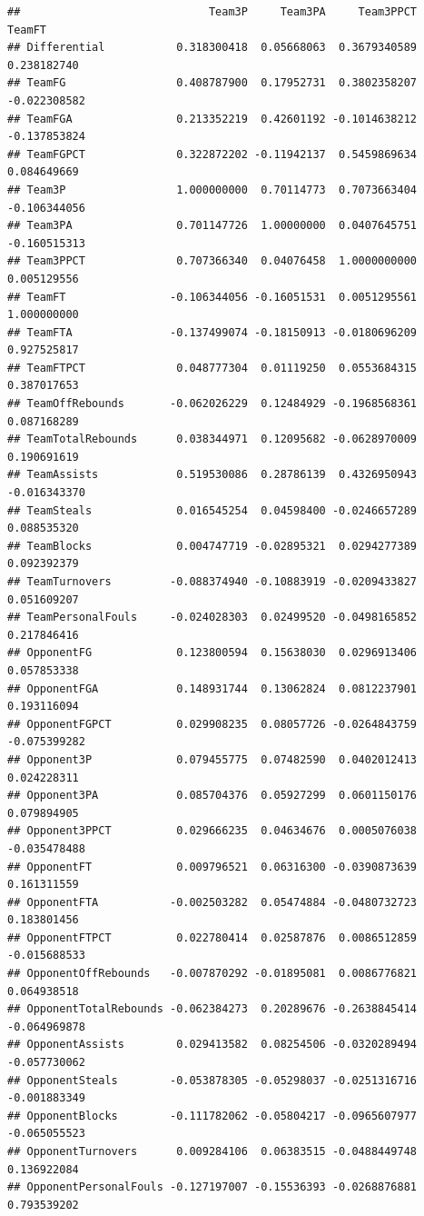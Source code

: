 \documentclass[
]{book}
\begin{document}
\begin{verbatim}
##                             Team3P     Team3PA     Team3PPCT       TeamFT
## Differential           0.318300418  0.05668063  0.3679340589  0.238182740
## TeamFG                 0.408787900  0.17952731  0.3802358207 -0.022308582
## TeamFGA                0.213352219  0.42601192 -0.1014638212 -0.137853824
## TeamFGPCT              0.322872202 -0.11942137  0.5459869634  0.084649669
## Team3P                 1.000000000  0.70114773  0.7073663404 -0.106344056
## Team3PA                0.701147726  1.00000000  0.0407645751 -0.160515313
## Team3PPCT              0.707366340  0.04076458  1.0000000000  0.005129556
## TeamFT                -0.106344056 -0.16051531  0.0051295561  1.000000000
## TeamFTA               -0.137499074 -0.18150913 -0.0180696209  0.927525817
## TeamFTPCT              0.048777304  0.01119250  0.0553684315  0.387017653
## TeamOffRebounds       -0.062026229  0.12484929 -0.1968568361  0.087168289
## TeamTotalRebounds      0.038344971  0.12095682 -0.0628970009  0.190691619
## TeamAssists            0.519530086  0.28786139  0.4326950943 -0.016343370
## TeamSteals             0.016545254  0.04598400 -0.0246657289  0.088535320
## TeamBlocks             0.004747719 -0.02895321  0.0294277389  0.092392379
## TeamTurnovers         -0.088374940 -0.10883919 -0.0209433827  0.051609207
## TeamPersonalFouls     -0.024028303  0.02499520 -0.0498165852  0.217846416
## OpponentFG             0.123800594  0.15638030  0.0296913406  0.057853338
## OpponentFGA            0.148931744  0.13062824  0.0812237901  0.193116094
## OpponentFGPCT          0.029908235  0.08057726 -0.0264843759 -0.075399282
## Opponent3P             0.079455775  0.07482590  0.0402012413  0.024228311
## Opponent3PA            0.085704376  0.05927299  0.0601150176  0.079894905
## Opponent3PPCT          0.029666235  0.04634676  0.0005076038 -0.035478488
## OpponentFT             0.009796521  0.06316300 -0.0390873639  0.161311559
## OpponentFTA           -0.002503282  0.05474884 -0.0480732723  0.183801456
## OpponentFTPCT          0.022780414  0.02587876  0.0086512859 -0.015688533
## OpponentOffRebounds   -0.007870292 -0.01895081  0.0086776821  0.064938518
## OpponentTotalRebounds -0.062384273  0.20289676 -0.2638845414 -0.064969878
## OpponentAssists        0.029413582  0.08254506 -0.0320289494 -0.057730062
## OpponentSteals        -0.053878305 -0.05298037 -0.0251316716 -0.001883349
## OpponentBlocks        -0.111782062 -0.05804217 -0.0965607977 -0.065055523
## OpponentTurnovers      0.009284106  0.06383515 -0.0488449748  0.136922084
## OpponentPersonalFouls -0.127197007 -0.15536393 -0.0268876881  0.793539202

\end{verbatim}
\end{document}
